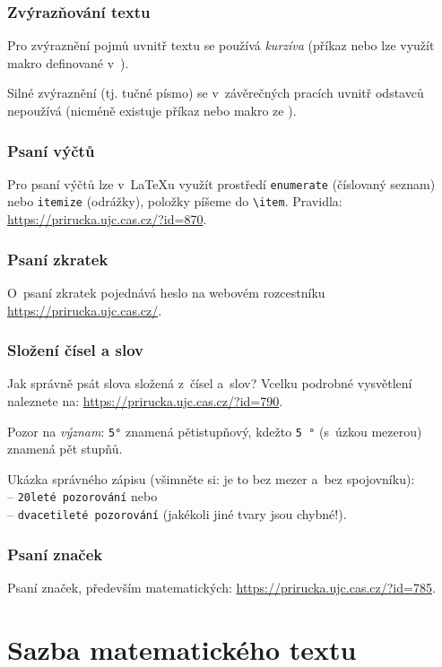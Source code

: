 \subsubsection*{Zvýrazňování textu}
Pro zvýraznění pojmů uvnitř textu se používá \textit{kurzíva} (příkaz  nebo lze využít makro  definované v~).\par 
Silné zvýraznění (tj. tučné písmo) se v~závěrečných pracích uvnitř odstavců nepoužívá (nicméně existuje příkaz  nebo makro  ze ).


\subsubsection*{Psaní výčtů}
Pro psaní výčtů lze v~\LaTeX{u} využít prostředí {\tt enumerate} (číslovaný seznam) nebo {\tt itemize} (odrážky), položky píšeme do {\tt \textbackslash item}. Pravidla: \url{https://prirucka.ujc.cas.cz/?id=870}.


\subsubsection*{Psaní zkratek}
O~psaní zkratek pojednává heslo  na webovém rozcestníku \url{https://prirucka.ujc.cas.cz/}.

\subsubsection*{Složení čísel a slov}
Jak správně psát slova složená z~čísel a~slov? Vcelku podrobné vysvětlení naleznete na: \url{https://prirucka.ujc.cas.cz/?id=790}.\par 
Pozor na \textit{význam}: {\tt 5°} znamená pětistupňový, kdežto {\tt 5\,°} (s~úzkou mezerou) znamená pět stupňů.\par 
Ukázka správného zápisu (všimněte si: je to bez mezer a~bez spojovníku):\\
-- {\tt 20leté pozorování} nebo\\
-- {\tt dvacetileté pozorování} (jakékoli jiné tvary jsou chybné!).\par


\subsubsection*{Psaní značek}
Psaní značek, především matematických: \url{https://prirucka.ujc.cas.cz/?id=785}.


\section{Sazba matematického textu}

